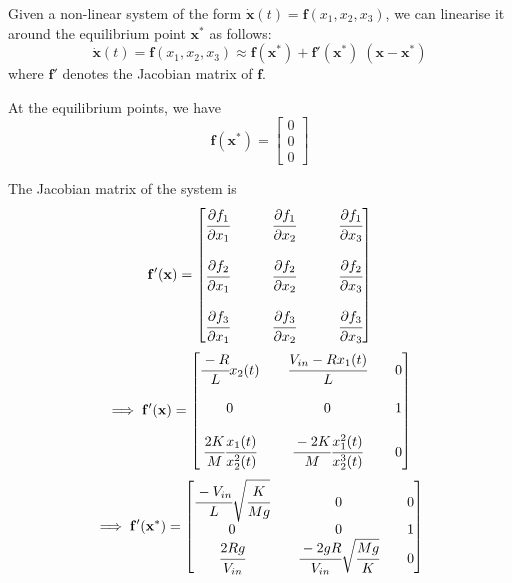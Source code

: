 Given a non-linear system of the form \( \mathbf{\dot x}(t) = \mathbf{f}(x_1, x_2, x_3) \), we can linearise it around the equilibrium point \( \mathbf{x^*} \) as follows:
\[
    \mathbf{\dot x}(t) = \mathbf{f}(x_1, x_2, x_3) \approx \mathbf{f}(\mathbf{x^*}) + \mathbf{f'}(\mathbf{x^*})\; (\mathbf{x} - \mathbf{x^*})
\]
where \(\mathbf{f'}\) denotes the Jacobian matrix of \(\mathbf{f}\).

At the equilibrium points, we have
\[
    \mathbf{f}(\mathbf{x^*}) =
    \begin{bmatrix}
        0 \\
        0 \\
        0
    \end{bmatrix}
\]

The Jacobian matrix of the system is
\[
    \mathbf{f'}(\mathbf{x}) =
    \begin{bmatrix}
        \cfrac{\partial f_1}{\partial x_1} &  &  & \cfrac{\partial f_1}{\partial x_2} &  &  & \cfrac{\partial f_1}{\partial x_3} \\
        \\
        \cfrac{\partial f_2}{\partial x_1} &  &  & \cfrac{\partial f_2}{\partial x_2} &  &  & \cfrac{\partial f_2}{\partial x_3} \\
        \\
        \cfrac{\partial f_3}{\partial x_1} &  &  & \cfrac{\partial f_3}{\partial x_2} &  &  & \cfrac{\partial f_3}{\partial x_3} \\
    \end{bmatrix}
\]
\[
    \implies
    \mathbf{f'}(\mathbf{x}) =
    \begin{bmatrix}
        \cfrac{-R}{L}x_2(t)                    &  & \cfrac{V_{in} - R x_1(t)}{L}              &  & 0 \\
        \\
        0                                      &  & 0                                         &  & 1 \\
        \\
        \cfrac{2K}{M} \cfrac{x_1(t)}{x_2^2(t)} &  & \cfrac{-2K}{M} \cfrac{x_1^2(t)}{x_2^3(t)} &  & 0
    \end{bmatrix}
\]
\[
    \implies
    \mathbf{f'}(\mathbf{x^*}) =
    \begin{bmatrix}
        \cfrac{-V_{in}}{L} \sqrt{\cfrac{K}{Mg}} &  & 0                                        &  & 0 \\
        0                                       &  & 0                                        &  & 1 \\
        \cfrac{2 R g}{V_{in}}                   &  & \cfrac{-2gR}{V_{in}}\sqrt{\cfrac{Mg}{K}} &  & 0
    \end{bmatrix}
\]


